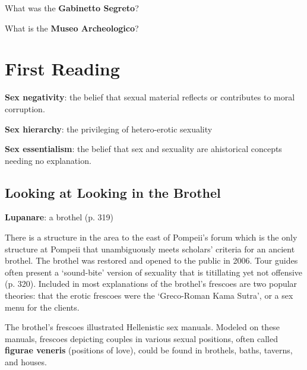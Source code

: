 \begin{qst}
    What was the \textbf{Gabinetto Segreto}?
\end{qst}


\begin{qst}
    What is the \textbf{Museo Archeologico}?
\end{qst}







\section{First Reading}
\label{sec:FirRead18}


\begin{defn}
    \textbf{Sex negativity}: the belief that sexual material reflects or contributes to moral corruption.
\end{defn}


\begin{defn}
    \textbf{Sex hierarchy}: the privileging of hetero-erotic sexuality
\end{defn}


\begin{defn}
    \textbf{Sex essentialism}: the belief that sex and sexuality are ahistorical concepts needing no explanation.
\end{defn}


\subsection{Looking at Looking in the Brothel}

\begin{defn}
    \textbf{Lupanare}: a brothel (p. 319)
\end{defn}

There is a structure in the area to the east of Pompeii's forum which is the only structure at Pompeii that unambiguously meets scholars' criteria for an ancient brothel. The brothel was restored and opened to the public in 2006. Tour guides often present a `sound-bite' version of sexuality that is titillating yet not offensive (p. 320). Included in most explanations of the brothel's frescoes are two popular theories: that the erotic frescoes were the `Greco-Roman Kama Sutra', or a sex menu for the clients.

\begin{rmk}
    The brothel's frescoes illustrated Hellenistic sex manuals. Modeled on these manuals, frescoes depicting couples in various sexual positions, often called \textbf{figurae veneris} (positions of love), could be found in brothels, baths, taverns, and houses.
\end{rmk}

